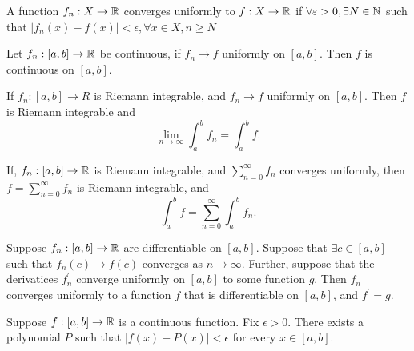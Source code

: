 \documentclass[twoside]{article}
\begin{document}
\begin{definition}
	A function $f_{n} : X \to \mathbb{R}$ converges uniformly to $f : X \to \mathbb{R}$ if
	$\forall \varepsilon > 0, \exists N \in \mathbb{N}$ such that $|f_{n}(x) - f(x) | < \epsilon , \forall x \in X, n \geq N$
\end{definition}

\begin{theorem}
	Let $f_{n} : [a, b] \to \mathbb{R}$ be continuous, if $f_{n} \to f$ uniformly on $[a,b]$.
	Then $f$ is continuous on $[a,b]$.
\end{theorem}

\begin{theorem}
	If $f_{n} : [a,b] \to R$ is Riemann integrable, and $f_{n} \to f$ uniformly on
	$[a,b]$. Then $f$ is Riemann integrable and
	\begin{equation*}
		\lim_{n \to \infty} \int_{a}^{b}f_{n} = \int_{a}^{b} f.
	\end{equation*}
\end{theorem}

\begin{corollary}
	If, $f_{n} : [a,b] \to \mathbb{R}$ is Riemann integrable, and $\sum_{n = 0}^{\infty} f_{n}$ converges uniformly,
	then $f = \sum_{n = 0}^{\infty} f_{n}$ is Riemann integrable, and
	\begin{equation*}
		\int_{a}^{b} f = \sum_{n = 0}^{\infty} \int_{a}^{b} f_{n}.
	\end{equation*}
\end{corollary}

\begin{theorem}
	Suppose $f_{n} : [a, b] \to \mathbb{R}$ are differentiable on $[a, b]$.
	Suppose that $\exists c \in [a,b]$ such that $f_{n}(c) \to f(c)$ converges as $n \to \infty$.
	Further, suppose that the derivatices $f^{\prime}_{n}$ converge uniformly on $[a, b]$
	to some function $g$. Then $f_{n}$ converges uniformly to a function $f$
	that is differentiable on $[a, b]$, and $f^{\prime} = g$.
\end{theorem}

\begin{theorem}
	Suppose $f : [a,b] \to \mathbb{R}$ is a continuous function. Fix $\epsilon > 0$. There exists
	a polynomial $P$ such that $|f(x) - P(x)| < \epsilon$ for every $x \in [a,b]$.
\end{theorem}
\end{document}
